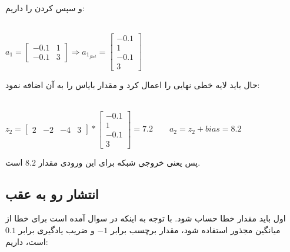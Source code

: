 و سپس 
کردن را داریم:
\begin{latin}
	~\\
$
	a_1 = \begin{bmatrix}
		-0.1 & 1 \\
		-0.1 & 3
	\end{bmatrix}
	\Rightarrow
	a_{1_{flat}} = \begin{bmatrix}
		-0.1 \\
		1 \\
		-0.1 \\
		3
	\end{bmatrix}
	$
\end{latin}
حال باید لایه خطی نهایی را اعمال کرد و مقدار بایاس را به آن اضافه نمود:
\begin{latin}
	~\\
	$
z_2 = 		\begin{bmatrix}
	2 &
	-2 &
	-4 &
	3
\end{bmatrix} * \begin{bmatrix}
-0.1 \\
1 \\
-0.1 \\
3
\end{bmatrix}
= 7.2
\qquad 
a_2 = z_2 + bias = 8.2
	$
\end{latin}
پس یعنی خروجی شبکه برای این ورودی مقدار $8.2$ است.
\subsection{انتشار رو به عقب}

اول باید مقدار خطا حساب شود. با توجه به اینکه در سوال آمده است برای خطا از میانگین مجذور استفاده شود، مقدار برچسب برابر 
$-1$
 و ضریب یادگیری برابر 
 $0.1$
 است، داریم:
 
